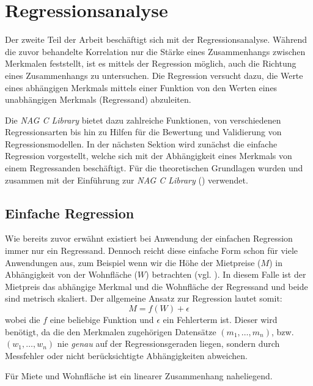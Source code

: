 \section{Regressionsanalyse}

Der zweite Teil der Arbeit beschäftigt sich mit der Regressionsanalyse.
Während die zuvor behandelte Korrelation nur die Stärke eines Zusammenhangs zwischen Merkmalen feststellt, ist es mittels der Regression möglich, auch die Richtung eines Zusammenhangs zu untersuchen.
Die Regression versucht dazu, die Werte eines abhängigen Merkmals mittels einer Funktion von den Werten eines unabhängigen Merkmals (Regressand) abzuleiten.


Die {\it NAG C Library} bietet dazu zahlreiche Funktionen, von verschiedenen Regressionsarten bis hin zu Hilfen für die Bewertung und Validierung von Regressionsmodellen.
In der nächsten Sektion wird zunächst die einfache Regression vorgestellt, welche sich mit der Abhängigkeit eines Merkmals von einem Regressanden beschäftigt.
Für die theoretischen Grundlagen wurden \cite{Cramer2007} und \cite{Fahrmeir2010} zusammen mit der Einführung zur {\it NAG C Library} (\cite{nag:intro}) verwendet.

\subsection{Einfache Regression}

Wie bereits zuvor erwähnt existiert bei Anwendung der einfachen Regression immer nur ein Regressand.
Dennoch reicht diese einfache Form schon für viele Anwendungen aus, zum Beispiel wenn wir die Höhe der Mietpreise ($M$) in Abhängigkeit von der Wohnfläche ($W$) betrachten (vgl. ).
In diesem Falle ist der Mietpreis das abhängige Merkmal und die Wohnfläche der Regressand und beide sind metrisch skaliert.
Der allgemeine Ansatz zur Regression lautet somit:
\begin{equation*}
 M = f(W) + \epsilon
\end{equation*}
wobei die $f$ eine beliebige Funktion und $\epsilon$ ein Fehlerterm ist.
Dieser wird benötigt, da die den Merkmalen zugehörigen Datensätze $(m_1, \dots, m_n)$, bzw. $(w_1, \dots, w_n)$ nie \textit{genau} auf der Regressionsgeraden liegen, sondern durch Messfehler oder nicht berücksichtigte Abhängigkeiten abweichen.

Für Miete und Wohnfläche ist ein linearer Zusammenhang naheliegend.



